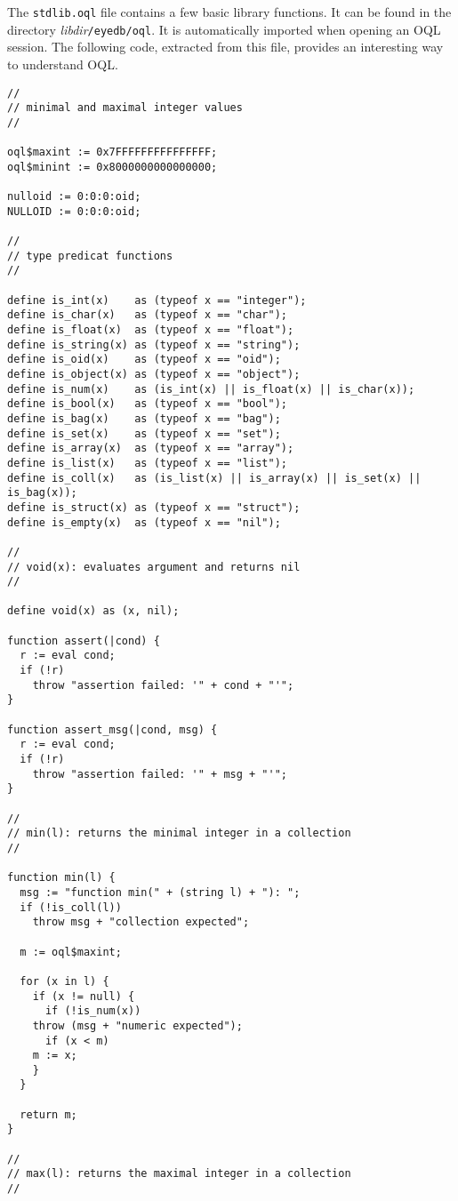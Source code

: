 The \texttt{stdlib.oql} file contains a few basic library functions.
It can be found in the directory \emph{libdir}\texttt{/eyedb/oql}.
It is automatically imported when opening an OQL session.
The following code, extracted from this file, provides an interesting way to
understand OQL.
\begin{verbatim}
//
// minimal and maximal integer values
//

oql$maxint := 0x7FFFFFFFFFFFFFFF;
oql$minint := 0x8000000000000000;

nulloid := 0:0:0:oid;
NULLOID := 0:0:0:oid;

//
// type predicat functions
//

define is_int(x)    as (typeof x == "integer");
define is_char(x)   as (typeof x == "char");
define is_float(x)  as (typeof x == "float");
define is_string(x) as (typeof x == "string");
define is_oid(x)    as (typeof x == "oid");
define is_object(x) as (typeof x == "object");
define is_num(x)    as (is_int(x) || is_float(x) || is_char(x));
define is_bool(x)   as (typeof x == "bool");
define is_bag(x)    as (typeof x == "bag");
define is_set(x)    as (typeof x == "set");
define is_array(x)  as (typeof x == "array");
define is_list(x)   as (typeof x == "list");
define is_coll(x)   as (is_list(x) || is_array(x) || is_set(x) || is_bag(x));
define is_struct(x) as (typeof x == "struct");
define is_empty(x)  as (typeof x == "nil");

//
// void(x): evaluates argument and returns nil
//

define void(x) as (x, nil);

function assert(|cond) {
  r := eval cond;
  if (!r)
    throw "assertion failed: '" + cond + "'";
}

function assert_msg(|cond, msg) {
  r := eval cond;
  if (!r)
    throw "assertion failed: '" + msg + "'";
}

//
// min(l): returns the minimal integer in a collection
//

function min(l) {
  msg := "function min(" + (string l) + "): ";
  if (!is_coll(l))
    throw msg + "collection expected";

  m := oql$maxint;

  for (x in l) {
    if (x != null) {
      if (!is_num(x))
	throw (msg + "numeric expected");
      if (x < m) 
	m := x;
    }
  }

  return m;
}

//
// max(l): returns the maximal integer in a collection
//


\end{verbatim}
